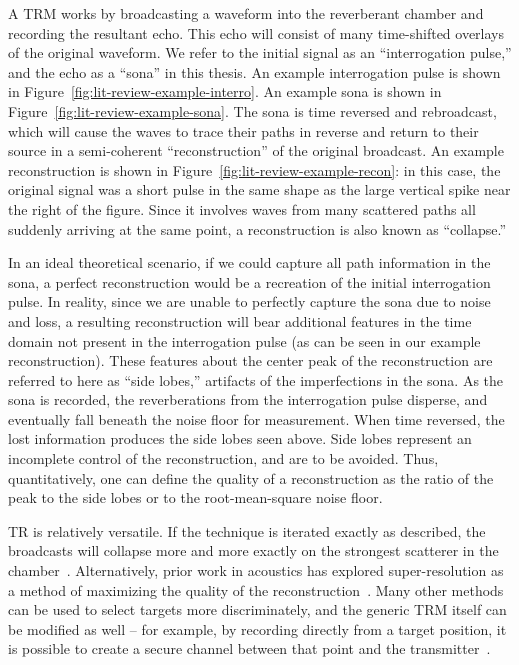 A TRM works by broadcasting a waveform into the reverberant chamber and recording the resultant echo. This echo will consist of many time-shifted overlays of the original waveform. We refer to the initial signal as an ``interrogation pulse,'' and the echo as a ``sona'' in this thesis. An example interrogation pulse is shown in Figure~\ref{fig:lit-review-example-interro}. An example sona is shown in Figure~\ref{fig:lit-review-example-sona}. The sona is time reversed and rebroadcast, which will cause the waves to trace their paths in reverse and return to their source in a semi-coherent ``reconstruction'' of the original broadcast. An example reconstruction is shown in Figure~\ref{fig:lit-review-example-recon}: in this case, the original signal was a short pulse in the same shape as the large vertical spike near the right of the figure. Since it involves waves from many scattered paths all suddenly arriving at the same point, a reconstruction is also known as ``collapse.''

In an ideal theoretical scenario, if we could capture all path information in the sona, a perfect reconstruction would be a recreation of the initial interrogation pulse. In reality, since we are unable to perfectly capture the sona due to noise and loss, a resulting reconstruction will bear additional features in the time domain not present in the interrogation pulse (as can be seen in our example reconstruction). These features about the center peak of the reconstruction are referred to here as ``side lobes,'' artifacts of the imperfections in the sona. As the sona is recorded, the reverberations from the interrogation pulse disperse, and eventually fall beneath the noise floor for measurement. When time reversed, the lost information produces the side lobes seen above. Side lobes represent an incomplete control of the reconstruction, and are to be avoided. Thus, quantitatively, one can define the quality of a reconstruction as the ratio of the peak to the side lobes or to the root-mean-square noise floor.

TR is relatively versatile. If the technique is iterated exactly as described, the broadcasts will collapse more and more exactly on the strongest scatterer in the chamber~\cite{fink_time-reversed_1999}. Alternatively, prior work in acoustics has explored super-resolution as a method of maximizing the quality of the reconstruction~\cite{fink-super-1,fink-super-2,blomgren-super-3}. Many other methods can be used to select targets more discriminately, and the generic TRM itself can be modified as well -- for example, by recording directly from a target position, it is possible to create a secure channel between that point and the transmitter~\cite{nltr-wave-chaotic}.

